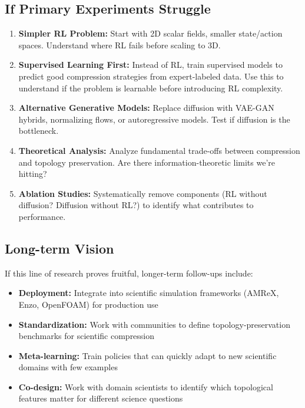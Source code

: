 \documentclass[11pt]{article}
\begin{document}
\subsection{If Primary Experiments Struggle}

\begin{enumerate}
    \item \textbf{Simpler RL Problem:} Start with 2D scalar fields, smaller state/action spaces. Understand where RL fails before scaling to 3D.

    \item \textbf{Supervised Learning First:} Instead of RL, train supervised models to predict good compression strategies from expert-labeled data. Use this to understand if the problem is learnable before introducing RL complexity.

    \item \textbf{Alternative Generative Models:} Replace diffusion with VAE-GAN hybrids, normalizing flows, or autoregressive models. Test if diffusion is the bottleneck.

    \item \textbf{Theoretical Analysis:} Analyze fundamental trade-offs between compression and topology preservation. Are there information-theoretic limits we're hitting?

    \item \textbf{Ablation Studies:} Systematically remove components (RL without diffusion? Diffusion without RL?) to identify what contributes to performance.
\end{enumerate}

\subsection{Long-term Vision}

If this line of research proves fruitful, longer-term follow-ups include:

\begin{itemize}
    \item \textbf{Deployment:} Integrate into scientific simulation frameworks (AMReX, Enzo, OpenFOAM) for production use
    \item \textbf{Standardization:} Work with communities to define topology-preservation benchmarks for scientific compression
    \item \textbf{Meta-learning:} Train policies that can quickly adapt to new scientific domains with few examples
    \item \textbf{Co-design:} Work with domain scientists to identify which topological features matter for different science questions
\end{itemize}
\end{document}
